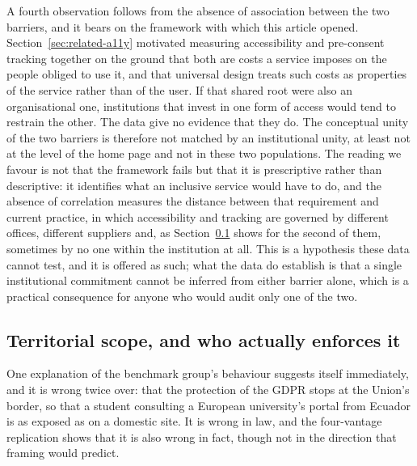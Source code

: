 \documentclass[pdflatex,sn-basic,Numbered,iicol]{sn-jnl}
\theoremstyle{thmstyleone}
\theoremstyle{thmstyletwo}
\theoremstyle{thmstylethree}
\begin{document}
A fourth observation follows from the absence of association between the two barriers, and it bears on the framework with which this article opened. Section~\ref{sec:related-a11y} motivated measuring accessibility and pre-consent tracking together on the ground that both are costs a service imposes on the people obliged to use it, and that universal design treats such costs as properties of the service rather than of the user. If that shared root were also an organisational one, institutions that invest in one form of access would tend to restrain the other. The data give no evidence that they do. The conceptual unity of the two barriers is therefore not matched by an institutional unity, at least not at the level of the home page and not in these two populations. The reading we favour is not that the framework fails but that it is prescriptive rather than descriptive: it identifies what an inclusive service would have to do, and the absence of correlation measures the distance between that requirement and current practice, in which accessibility and tracking are governed by different offices, different suppliers and, as Section~\ref{sec:discussion-legal} shows for the second of them, sometimes by no one within the institution at all. This is a hypothesis these data cannot test, and it is offered as such; what the data do establish is that a single institutional commitment cannot be inferred from either barrier alone, which is a practical consequence for anyone who would audit only one of the two.

\subsection{Territorial scope, and who actually enforces it}\label{sec:discussion-legal}

One explanation of the benchmark group's behaviour suggests itself immediately, and it is wrong twice over: that the protection of the GDPR stops at the Union's border, so that a student consulting a European university's portal from Ecuador is as exposed as on a domestic site. It is wrong in law, and the four-vantage replication shows that it is also wrong in fact, though not in the direction that framing would predict.
\end{document}
